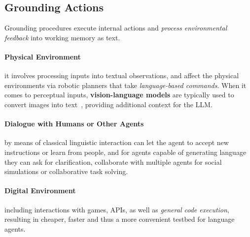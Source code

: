 \subsection{Grounding Actions}
Grounding procedures execute internal actions and \emph{process environmental
feedback} into working memory as text.

\paragraph{Physical Environment} it involves processing inputs into textual
observations, and affect the physical environments via robotic planners that
take \emph{language-based commands}. When it comes to perceptual inputs,
\textbf{vision-language models} are typically used to convert images into
text~\cite{alayrac2022flamingovisuallanguagemodel}, providing additional
context for the \ac{LLM}.

\paragraph{Dialogue with Humans or Other Agents} by means of classical
linguistic interaction can let the agent to accept new instructions or learn
from people, and for agents capable of generating language they can ask for
clarification, collaborate with multiple agents for social simulations or
collaborative task solving.

\paragraph{Digital Environment} including interactions with games, APIs, as well as
\emph{general code execution}, resulting in cheaper, faster and thus a more convenient
testbed for language agents.


